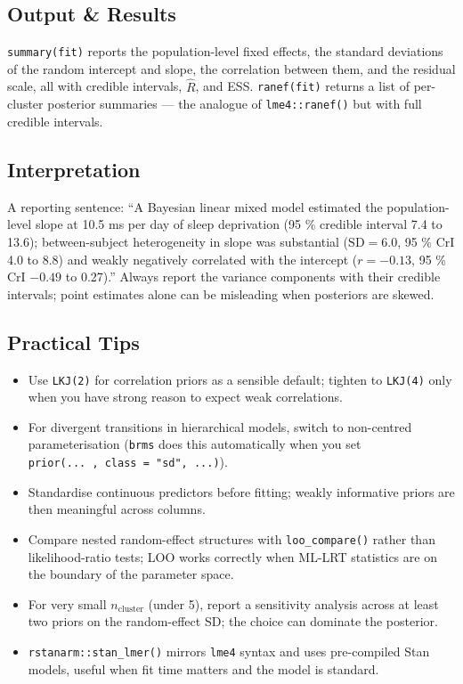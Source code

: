 \documentclass[
]{article}
\providecommand{\tightlist}{%
  \setlength{\itemsep}{0pt}\setlength{\parskip}{0pt}}
\begin{document}
\subsection{Output \& Results}\label{output-results}

\texttt{summary(fit)} reports the population-level fixed effects, the
standard deviations of the random intercept and slope, the correlation
between them, and the residual scale, all with credible intervals,
\(\hat R\), and ESS. \texttt{ranef(fit)} returns a list of per-cluster
posterior summaries --- the analogue of \texttt{lme4::ranef()} but with
full credible intervals.

\subsection{Interpretation}\label{interpretation}

A reporting sentence: ``A Bayesian linear mixed model estimated the
population-level slope at 10.5 ms per day of sleep deprivation (95 \%
credible interval 7.4 to 13.6); between-subject heterogeneity in slope
was substantial (\(\mathrm{SD} = 6.0\), 95 \% CrI 4.0 to 8.8) and weakly
negatively correlated with the intercept (\(r = -0.13\), 95 \% CrI
\(-0.49\) to 0.27).'' Always report the variance components with their
credible intervals; point estimates alone can be misleading when
posteriors are skewed.

\subsection{Practical Tips}\label{practical-tips}

\begin{itemize}
\tightlist
\item
  Use \texttt{LKJ(2)} for correlation priors as a sensible default;
  tighten to \texttt{LKJ(4)} only when you have strong reason to expect
  weak correlations.
\item
  For divergent transitions in hierarchical models, switch to
  non-centred parameterisation (\texttt{brms} does this automatically
  when you set \texttt{prior(...\ ,\ class\ =\ "sd",\ ...)}).
\item
  Standardise continuous predictors before fitting; weakly informative
  priors are then meaningful across columns.
\item
  Compare nested random-effect structures with \texttt{loo\_compare()}
  rather than likelihood-ratio tests; LOO works correctly when ML-LRT
  statistics are on the boundary of the parameter space.
\item
  For very small \(n_{\text{cluster}}\) (under 5), report a sensitivity
  analysis across at least two priors on the random-effect SD; the
  choice can dominate the posterior.
\item
  \texttt{rstanarm::stan\_lmer()} mirrors \texttt{lme4} syntax and uses
  pre-compiled Stan models, useful when fit time matters and the model
  is standard.
\end{itemize}
\end{document}
